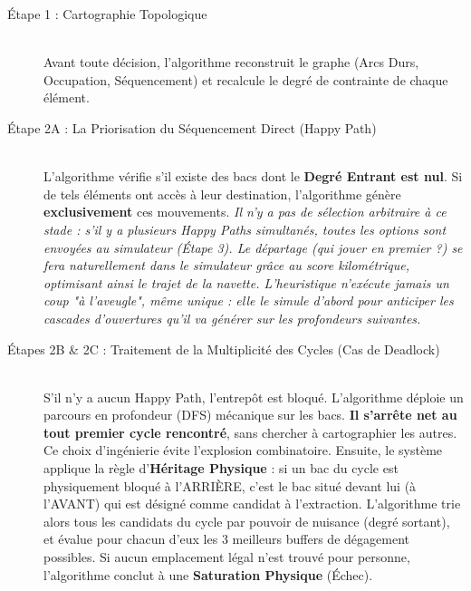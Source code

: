 \documentclass[11pt,a4paper]{article}
\begin{document}
\begin{description}
    \item[Étape 1 : Cartographie Topologique] \hfill \\
    Avant toute décision, l'algorithme reconstruit le graphe (Arcs Durs, Occupation, Séquencement) et recalcule le degré de contrainte de chaque élément.
    
    \item[Étape 2A : La Priorisation du Séquencement Direct (Happy Path)] \hfill \\
    L'algorithme vérifie s'il existe des bacs dont le \textbf{Degré Entrant est nul}. Si de tels éléments ont accès à leur destination, l'algorithme génère \textbf{exclusivement} ces mouvements. \emph{Il n'y a pas de sélection arbitraire à ce stade : s'il y a plusieurs Happy Paths simultanés, toutes les options sont envoyées au simulateur (Étape 3). Le départage (qui jouer en premier ?) se fera naturellement dans le simulateur grâce au score kilométrique, optimisant ainsi le trajet de la navette. L'heuristique n'exécute jamais un coup "à l'aveugle", même unique : elle le simule d'abord pour anticiper les cascades d'ouvertures qu'il va générer sur les profondeurs suivantes.}
    
    \item[Étapes 2B \& 2C : Traitement de la Multiplicité des Cycles (Cas de Deadlock)] \hfill \\
    S'il n'y a aucun Happy Path, l'entrepôt est bloqué. L'algorithme déploie un parcours en profondeur (DFS) mécanique sur les bacs. \textbf{Il s'arrête net au tout premier cycle rencontré}, sans chercher à cartographier les autres. Ce choix d'ingénierie évite l'explosion combinatoire. 
    Ensuite, le système applique la règle d'\textbf{Héritage Physique} : si un bac du cycle est physiquement bloqué à l'ARRIÈRE, c'est le bac situé devant lui (à l'AVANT) qui est désigné comme candidat à l'extraction. L'algorithme trie alors tous les candidats du cycle par pouvoir de nuisance (degré sortant), et évalue pour chacun d'eux les 3 meilleurs buffers de dégagement possibles. Si aucun emplacement légal n'est trouvé pour personne, l'algorithme conclut à une \textbf{Saturation Physique} (Échec).


\end{description}
\end{document}
